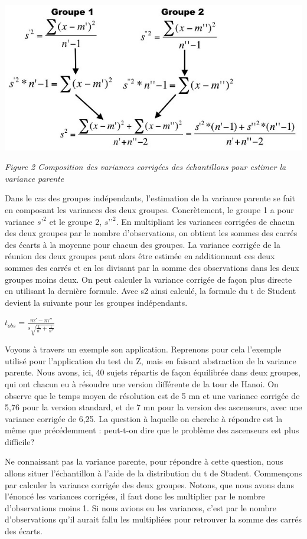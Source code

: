 \documentclass[]{book}
\theoremstyle{definition}
\theoremstyle{definition}
\theoremstyle{definition}
\theoremstyle{remark}
\begin{document}
\includegraphics{compositionVariance.jpg}

\emph{Figure 2 Composition des variances corrigées des échantillons pour
estimer la variance parente}

Dans le cas des groupes indépendants, l'estimation de la variance
parente se fait en composant les variances des deux groupes.
Concrètement, le groupe 1 a pour variance \(s’^2\) et le groupe 2,
\(s’’^2\). En multipliant les variances corrigées de chacun des deux
groupes par le nombre d'observations, on obtient les sommes des carrés
des écarts à la moyenne pour chacun des groupes. La variance corrigée de
la réunion des deux groupes peut alors être estimée en additionnant ces
deux sommes des carrés et en les divisant par la somme des observations
dans les deux groupes moins deux. On peut calculer la variance corrigée
de façon plus directe en utilisant la dernière formule. Avec s2 ainsi
calculé, la formule du t de Student devient la suivante pour les groupes
indépendants.

\(t_{obs} = \frac{m{}'-m{}''}{s\sqrt{\frac{1}{n{}'}+\frac{1}{n{}''}}}\)

Voyons à travers un exemple son application. Reprenons pour cela
l'exemple utilisé pour l'application du test du Z, mais en faisant
abstraction de la variance parente. Nous avons, ici, 40 sujets répartis
de façon équilibrée dans deux groupes, qui ont chacun eu à résoudre une
version différente de la tour de Hanoi. On observe que le temps moyen de
résolution est de 5 mn et une variance corrigée de 5,76 pour la version
standard, et de 7 mn pour la version des ascenseurs, avec une variance
corrigée de 6,25. La question à laquelle on cherche à répondre est la
même que précédemment : peut-t-on dire que le problème des ascenseurs
est plus difficile?

Ne connaissant pas la variance parente, pour répondre à cette question,
nous allons situer l'échantillon à l'aide de la distribution du t de
Student. Commençons par calculer la variance corrigée des deux groupes.
Notons, que nous avons dans l'énoncé les variances corrigées, il faut
donc les multiplier par le nombre d'observations moins 1. Si nous avions
eu les variances, c'est par le nombre d'observations qu'il aurait fallu
les multipliées pour retrouver la somme des carrés des écarts.
\end{document}
